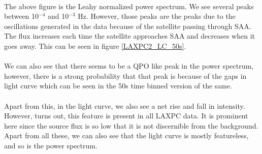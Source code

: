 \documentclass[a4paper,twoside]{report}
\numberwithin{equation}{section}
\begin{document}
\paragraph{}
The above figure is the Leahy normalized power spectrum. We see several peaks between 10$^{-4}$ and 10$^{-3}$ Hz. However, those peaks are the peaks due to the oscillations generated in the data because of the satellite passing through SAA. The flux increases each time the satellite approaches SAA and decreases when it goes away. This can be seen in figure \ref{LAXPC2_LC_50s}. 
\paragraph{}
We can also see that there seems to be a QPO like peak in the power spectrum, however, there is a strong probability that that peak is because of the gaps in light curve which can be seen in the 50s time binned version of the same. 
\paragraph{}
Apart from this, in the light curve, we also see a net rise and fall in intensity. However, turns out, this feature is present in all LAXPC data. It is prominent here since the source flux is so low that it is not discernible from the background. Apart from all these, we can also see that the light curve is mostly featureless, and so is the power spectrum. 
\end{document}
